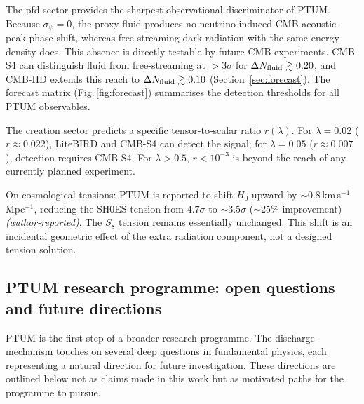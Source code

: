 \documentclass[epj]{svjour}
\begin{document}
The pfd sector provides the sharpest observational discriminator of
PTUM. Because $\sigma_\psi=0$, the proxy-fluid produces no
neutrino-induced CMB acoustic-peak phase shift, whereas free-streaming
dark radiation with the same energy density does. This absence is
directly testable by future CMB experiments. CMB-S4 can distinguish
fluid from free-streaming at $>3\sigma$ for
$\Delta N_{\rm fluid}\gtrsim0.20$, and CMB-HD extends this reach
to $\Delta N_{\rm fluid}\gtrsim0.10$ (Section~\ref{sec:forecast}).
The forecast matrix (Fig.\,\ref{fig:forecast}) summarises the
detection thresholds for all PTUM observables.

The creation sector predicts a specific tensor-to-scalar ratio
$r(\lambda)$. For $\lambda=0.02$ ($r\approx0.022$), LiteBIRD and
CMB-S4 can detect the signal; for $\lambda=0.05$ ($r\approx0.007$),
detection requires CMB-S4. For $\lambda>0.5$, $r<10^{-3}$ is beyond
the reach of any currently planned experiment.

On cosmological tensions: PTUM is reported to shift $H_0$ upward by
$\sim0.8\,$km\,s$^{-1}$\,Mpc$^{-1}$, reducing the SH0ES tension
from $4.7\sigma$ to $\sim3.5\sigma$ ($\sim25\%$ improvement)
\emph{(author-reported)}.
The $S_8$ tension remains essentially unchanged. This shift is an
incidental geometric effect of the extra radiation component, not a
designed tension solution.

\subsection{PTUM research programme: open questions and future directions}
\label{sec:roadmap}

PTUM is the first step of a broader research programme. The discharge
mechanism touches on several deep questions in fundamental physics,
each representing a natural direction for future investigation.
These directions are outlined below not as claims made in this work
but as motivated paths for the programme to pursue.
\end{document}
